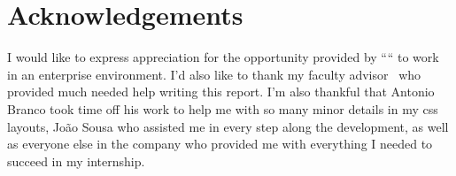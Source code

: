 


% 
% 
% 

\begingroup
\let\clearpage\relax
\let\cleardoublepage\relax
\let\cleardoublepage\relax
\chapter*{Acknowledgements}

I would like to express appreciation for the opportunity provided by ``\company`` to work
in an enterprise environment. I'd also like to thank my faculty advisor \myProf\ 
who provided much needed help writing this report. I'm also thankful that 
Antonio Branco took time off his work to help me with so many minor details in my \acrshort{css}
layouts, João Sousa who assisted me in every step along the development, as well as everyone
else in the company who provided me with everything I needed to succeed in my internship.\\



\endgroup



